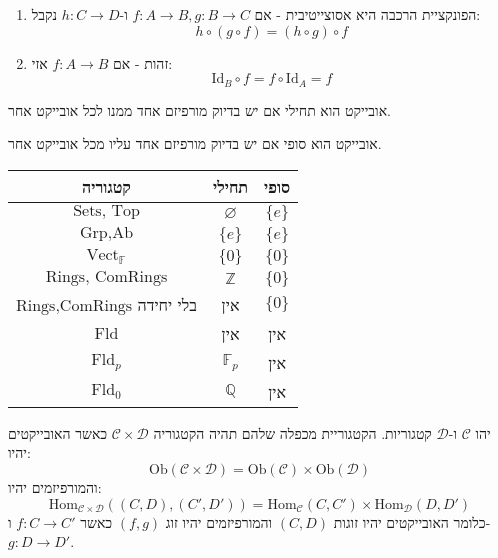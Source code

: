\documentclass{tstextbook}
\begin{document}
\begin{enumerate}
  \item הפונקציית הרכבה היא אסוצייטיבית - אם \(f:A\to B,g:B\to C\)  ו-\(h:C\to D\) נקבל: 
$$h\circ (g\circ  f)=(h\circ  g)\circ  f$$


  \item זהות - אם \(f:A\to B\) אזי: 
$$\mathrm{Id}_{B}\circ  f=f \circ  \mathrm{Id}_{A}=f$$


\end{enumerate}
\begin{definition}
אובייקט הוא תחילי אם יש בדיוק מורפיזם אחד ממנו לכל אובייקט אחר.

\end{definition}
\begin{definition}
אובייקט הוא סופי אם יש בדיוק מורפיזם אחד עליו מכל אובייקט אחר.

\end{definition}
\begin{example}
  \begin{table}[htbp]
    \centering
    \begin{tabular}{|ccc|}
      \hline
      קטגוריה & תחילי & סופי \\ \hline
      \(\text{Sets, Top}\) & \(\varnothing\) & \(\{ e \}\) \\ \hline
      \(\text{Grp,Ab}\) & \(\{ e \}\) & \(\{ e \}\) \\ \hline
      \(\text{Vect}_{\mathbb{F}}\) & \(\{ 0 \}\) & \(\{ 0 \}\) \\ \hline
      \(\text{Rings, ComRings}\) & \(\mathbb{Z}\) & \(\{ 0 \}\) \\ \hline
      \(\text{Rings,ComRings}\) בלי יחידה & אין & \(\{ 0 \}\) \\ \hline
      \(\text{Fld}\) & אין & אין \\ \hline
      \(\text{Fld}_{p}\) & \(\mathbb{F}_{p}\) & אין \\ \hline
      \(\text{Fld}_{0}\) & \(\mathbb{Q}\) & אין \\ \hline
    \end{tabular}
  \end{table}
\end{example}
\begin{definition}
יהו \(\mathcal{C}\) ו-\(\mathcal{D}\) קטגוריות. הקטגוריית מכפלה שלהם תהיה הקטגוריה \(\mathcal{C}\times \mathcal{D}\) כאשר האובייקטים יהיו:
$$\mathrm{Ob}\left( \mathcal{C} \times \mathcal{D}  \right)=\mathrm{Ob}\left( \mathcal{C}  \right)\times \mathrm{Ob}\left( \mathcal{D}  \right)$$
והמורפיזמים יהיו:
$$\mathrm{Hom}_{\mathcal{C} \times \mathcal{D} }((C,D),(C',D')) =\mathrm{Hom}_{\mathcal{C} }(C,C')\times \mathrm{Hom}_{\mathcal{D} }(D,D')$$
כלומר האובייקטים יהיו זוגות \((C,D)\) והמורפיזמים יהיו זוג \((f,g)\) כאשר \(f:C\to C'\) ו-\(g:D\to D'\).

\end{definition}
\end{document}
